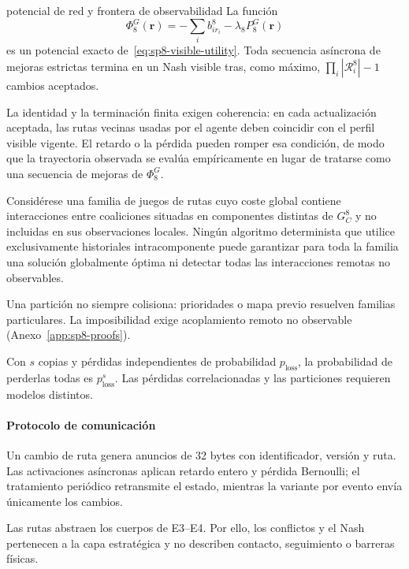 \begin{contribucion}{potencial de red y frontera de observabilidad}
La función
\[
 \Phi_8^G(\boldsymbol r)=-\sum_i b_{i r_i}^8-\lambda_8P_8^G(\boldsymbol r)
\]
es un potencial exacto de~\eqref{eq:sp8-visible-utility}. Toda secuencia asíncrona de mejoras estrictas termina en un Nash visible tras, como máximo, $\prod_i|\mathcal R_i^8|-1$ cambios aceptados.

La identidad y la terminación finita exigen coherencia: en cada actualización aceptada, las rutas vecinas usadas por el agente deben coincidir con el perfil visible vigente. El retardo o la pérdida pueden romper esa condición, de modo que la trayectoria observada se evalúa empíricamente en lugar de tratarse como una secuencia de mejoras de $\Phi_8^G$.

\begin{proposicion}
\label{prop:sp8-partition-limit}
Considérese una familia de juegos de rutas cuyo coste global contiene interacciones entre coaliciones situadas en componentes distintas de $G_C^8$ y no incluidas en sus observaciones locales. Ningún algoritmo determinista que utilice exclusivamente historiales intracomponente puede garantizar para toda la familia una solución globalmente óptima ni detectar todas las interacciones remotas no observables.
\end{proposicion}
Una partición no siempre colisiona: prioridades o mapa previo resuelven familias particulares. La imposibilidad exige acoplamiento remoto no observable (Anexo~\ref{app:sp8-proofs}).
\end{contribucion}

Con $s$ copias y pérdidas independientes de probabilidad $p_{\mathrm{loss}}$, la probabilidad de perderlas todas es $p_{\mathrm{loss}}^s$. Las pérdidas correlacionadas y las particiones requieren modelos distintos.

\paragraph{Protocolo de comunicación}

Un cambio de ruta genera anuncios de 32 bytes con identificador, versión y ruta. Las activaciones asíncronas aplican retardo entero y pérdida Bernoulli; el tratamiento periódico retransmite el estado, mientras la variante por evento envía únicamente los cambios.

Las rutas abstraen los cuerpos de E3--E4. Por ello, los conflictos y el Nash pertenecen a la capa estratégica y no describen contacto, seguimiento o barreras físicas.

